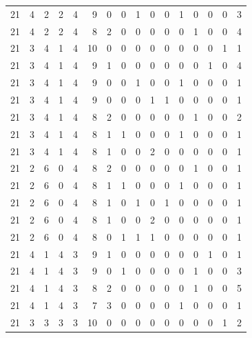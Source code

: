 \begin{appendix}
{\begin{longtable}{lrrrrrrrrrrrrrrr}
    21        & 4  & 2  & 2  & 4  & 9  & 0  & 0  & 1  & 0  & 0  & 1  & 0   & 0   & 0   & 3    \\
    21        & 4  & 2  & 2  & 4  & 8  & 2  & 0  & 0  & 0  & 0  & 0  & 1   & 0   & 0   & 4    \\
    21        & 3  & 4  & 1  & 4  & 10 & 0  & 0  & 0  & 0  & 0  & 0  & 0   & 0   & 1   & 1    \\
    21        & 3  & 4  & 1  & 4  & 9  & 1  & 0  & 0  & 0  & 0  & 0  & 0   & 1   & 0   & 4    \\
    21        & 3  & 4  & 1  & 4  & 9  & 0  & 0  & 1  & 0  & 0  & 1  & 0   & 0   & 0   & 1    \\
    21        & 3  & 4  & 1  & 4  & 9  & 0  & 0  & 0  & 1  & 1  & 0  & 0   & 0   & 0   & 1    \\
    21        & 3  & 4  & 1  & 4  & 8  & 2  & 0  & 0  & 0  & 0  & 0  & 1   & 0   & 0   & 2    \\
    21        & 3  & 4  & 1  & 4  & 8  & 1  & 1  & 0  & 0  & 0  & 1  & 0   & 0   & 0   & 1    \\
    21        & 3  & 4  & 1  & 4  & 8  & 1  & 0  & 0  & 2  & 0  & 0  & 0   & 0   & 0   & 1    \\
    21        & 2  & 6  & 0  & 4  & 8  & 2  & 0  & 0  & 0  & 0  & 0  & 1   & 0   & 0   & 1    \\
    21        & 2  & 6  & 0  & 4  & 8  & 1  & 1  & 0  & 0  & 0  & 1  & 0   & 0   & 0   & 1    \\
    21        & 2  & 6  & 0  & 4  & 8  & 1  & 0  & 1  & 0  & 1  & 0  & 0   & 0   & 0   & 1    \\
    21        & 2  & 6  & 0  & 4  & 8  & 1  & 0  & 0  & 2  & 0  & 0  & 0   & 0   & 0   & 1    \\
    21        & 2  & 6  & 0  & 4  & 8  & 0  & 1  & 1  & 1  & 0  & 0  & 0   & 0   & 0   & 1    \\
    21        & 4  & 1  & 4  & 3  & 9  & 1  & 0  & 0  & 0  & 0  & 0  & 0   & 1   & 0   & 1    \\
    21        & 4  & 1  & 4  & 3  & 9  & 0  & 1  & 0  & 0  & 0  & 0  & 1   & 0   & 0   & 3    \\
    21        & 4  & 1  & 4  & 3  & 8  & 2  & 0  & 0  & 0  & 0  & 0  & 1   & 0   & 0   & 5    \\
    21        & 4  & 1  & 4  & 3  & 7  & 3  & 0  & 0  & 0  & 0  & 1  & 0   & 0   & 0   & 1    \\
    21        & 3  & 3  & 3  & 3  & 10 & 0  & 0  & 0  & 0  & 0  & 0  & 0   & 0   & 1   & 2    \\

\end{longtable}}
\end{appendix}
